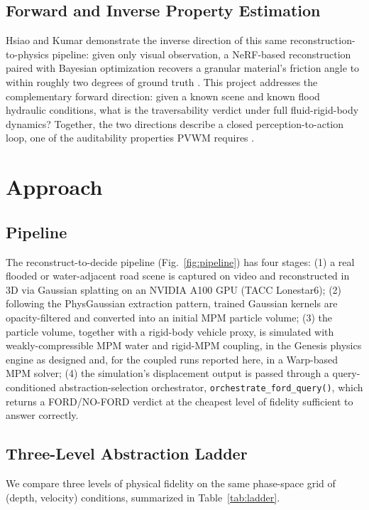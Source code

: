 \documentclass[conference]{IEEEtran}
\begin{document}
\subsection{Forward and Inverse Property Estimation}
Hsiao and Kumar demonstrate the inverse direction of this same reconstruction-to-physics pipeline: given only visual observation, a NeRF-based reconstruction paired with Bayesian optimization recovers a granular material's friction angle to within roughly two degrees of ground truth \cite{hsiao2025nerfmpm}. This project addresses the complementary forward direction: given a known scene and known flood hydraulic conditions, what is the traversability verdict under full fluid-rigid-body dynamics? Together, the two directions describe a closed perception-to-action loop, one of the auditability properties PVWM requires \cite{thorpe2026pvwm}.

\section{Approach}
\label{sec:approach}

\subsection{Pipeline}
The reconstruct-to-decide pipeline (Fig.~\ref{fig:pipeline}) has four stages: (1) a real flooded or water-adjacent road scene is captured on video and reconstructed in 3D via Gaussian splatting on an NVIDIA A100 GPU (TACC Lonestar6); (2) following the PhysGaussian extraction pattern, trained Gaussian kernels are opacity-filtered and converted into an initial MPM particle volume; (3) the particle volume, together with a rigid-body vehicle proxy, is simulated with weakly-compressible MPM water and rigid-MPM coupling, in the Genesis physics engine as designed and, for the coupled runs reported here, in a Warp-based MPM solver; (4) the simulation's displacement output is passed through a query-conditioned abstraction-selection orchestrator, \texttt{orchestrate\_ford\_query()}, which returns a FORD/NO-FORD verdict at the cheapest level of fidelity sufficient to answer correctly.

\subsection{Three-Level Abstraction Ladder}
We compare three levels of physical fidelity on the same phase-space grid of (depth, velocity) conditions, summarized in Table~\ref{tab:ladder}.
\end{document}
